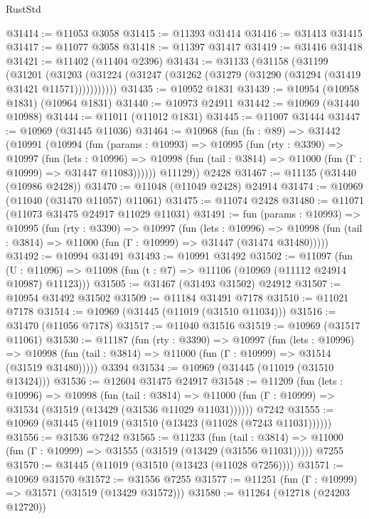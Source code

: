 \begin{lexlean}{RustStd}
\begin{coremodule}
@31414 := @11053 @3058
@31415 := @11393 @31414
@31416 := @31413 @31415
@31417 := @11077 @3058
@31418 := @11397 @31417
@31419 := @31416 @31418
@31421 := @11402 (@11404 @2396)
@31434 := @31133
    (@31158
      (@31199
        (@31201
          (@31203 (@31224 (@31247 (@31262 (@31279 (@31290 (@31294 (@31419 @31421 @11571)))))))))))
@31435 := @10952 @1831
@31439 := @10954 (@10958 @1831) (@10964 @1831)
@31440 := @10973 @24911
@31442 := @10969 (@31440 @10988)
@31444 := @11011 (@11012 @1831)
@31445 := @11007 @31444
@31447 := @10969 (@31445 @11036)
@31464 := @10968
    (fun (fn : @89) =>
    @31442
      (@10991
        (@10994
          (fun (params : @10993) =>
          @10995
            (fun (rty : @3390) =>
            @10997
              (fun (lets : @10996) =>
              @10998 (fun (tail : @3814) => @11000 (fun (Γ : @10999) => @31447 @11083))))))
        @11129))
    @2428
@31467 := @11135 (@31440 (@10986 @2428))
@31470 := @11048 (@11049 @2428) @24914
@31474 := @10969 (@11040 (@31470 @11057) @11061)
@31475 := @11074 @2428
@31480 := @11071 (@11073 @31475 @24917 @11029 @11031)
@31491 := fun (params : @10993) =>
  @10995
    (fun (rty : @3390) =>
    @10997
      (fun (lets : @10996) =>
      @10998 (fun (tail : @3814) => @11000 (fun (Γ : @10999) => @31447 (@31474 @31480)))))
@31492 := @10994 @31491
@31493 := @10991 @31492
@31502 := @11097
    (fun (U : @11096) => @11098 (fun (t : @7) => @11106 (@10969 (@11112 @24914 @10987) @11123)))
@31505 := @31467 (@31493 @31502) @24912
@31507 := @10954 @31492 @31502
@31509 := @11184 @31491 @7178
@31510 := @11021 @7178
@31514 := @10969 (@31445 (@11019 (@31510 @11034)))
@31516 := @31470 (@11056 @7178)
@31517 := @11040 @31516
@31519 := @10969 (@31517 @11061)
@31530 := @11187
    (fun (rty : @3390) =>
    @10997
      (fun (lets : @10996) =>
      @10998 (fun (tail : @3814) => @11000 (fun (Γ : @10999) => @31514 (@31519 @31480)))))
    @3394
@31534 := @10969 (@31445 (@11019 (@31510 @13424)))
@31536 := @12604 @31475 @24917
@31548 := @11209
    (fun (lets : @10996) =>
    @10998
      (fun (tail : @3814) =>
      @11000 (fun (Γ : @10999) => @31534 (@31519 (@13429 (@31536 @11029 @11031))))))
    @7242
@31555 := @10969 (@31445 (@11019 (@31510 (@13423 (@11028 (@7243 @11031))))))
@31556 := @31536 @7242
@31565 := @11233
    (fun (tail : @3814) => @11000 (fun (Γ : @10999) => @31555 (@31519 (@13429 (@31556 @11031)))))
    @7255
@31570 := @31445 (@11019 (@31510 (@13423 (@11028 @7256))))
@31571 := @10969 @31570
@31572 := @31556 @7255
@31577 := @11251 (fun (Γ : @10999) => @31571 (@31519 (@13429 @31572)))
@31580 := @11264 (@12718 (@24203 @12720))

\end{coremodule}
\end{lexlean}
